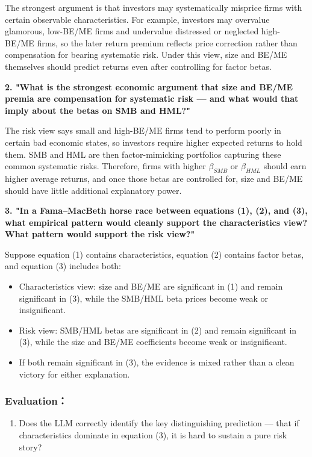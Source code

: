 \documentclass[11pt,letterpaper]{article}
\providecommand{\tightlist}{\setlength{\itemsep}{0pt}\setlength{\parskip}{0pt}}
\begin{document}
The strongest argument is that investors may systematically misprice firms with certain observable characteristics. For example, investors may overvalue glamorous, low-BE/ME firms and undervalue distressed or neglected high-BE/ME firms, so the later return premium reflects price correction rather than compensation for bearing systematic risk. Under this view, size and BE/ME themselves should predict returns even after controlling for factor betas.

\textbf{2. "What is the strongest economic argument that size and BE/ME premia are compensation for systematic risk --- and what would that imply about the betas on SMB and HML?"}

The risk view says small and high-BE/ME firms tend to perform poorly in certain bad economic states, so investors require higher expected returns to hold them. SMB and HML are then factor-mimicking portfolios capturing these common systematic risks. Therefore, firms with higher \(\beta_{SMB}\) or \(\beta_{HML}\) should earn higher average returns, and once those betas are controlled for, size and BE/ME should have little additional explanatory power.

\textbf{3. "In a Fama--MacBeth horse race between equations (1), (2), and (3), what empirical pattern would cleanly support the characteristics view? What pattern would support the risk view?"}

Suppose equation (1) contains characteristics, equation (2) contains factor betas, and equation (3) includes both:

\begin{itemize}
\item
  Characteristics view: size and BE/ME are significant in (1) and remain significant in (3), while the SMB/HML beta prices become weak or insignificant.
\item
  Risk view: SMB/HML betas are significant in (2) and remain significant in (3), while the size and BE/ME coefficients become weak or insignificant.
\item
  If both remain significant in (3), the evidence is mixed rather than a clean victory for either explanation.
\end{itemize}

\hypertarget{evaluation}{%
\subsubsection{Evaluation：}\label{evaluation}}

\begin{enumerate}
\def\labelenumi{\arabic{enumi}.}
\tightlist
\item
  Does the LLM correctly identify the key distinguishing prediction --- that if characteristics dominate in equation (3), it is hard to sustain a pure risk story?
\end{enumerate}
\end{document}
